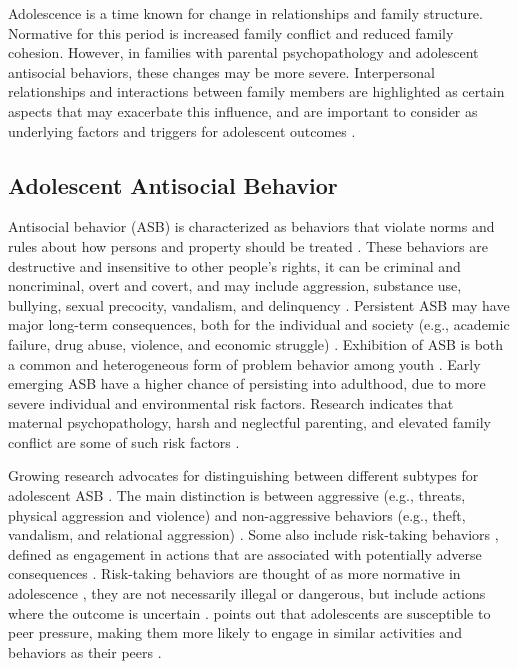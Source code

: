 
Adolescence is a time known for change in relationships and family structure. Normative for this period is increased family conflict and reduced family cohesion. However, in families with parental psychopathology and adolescent antisocial behaviors, these changes may be more severe. Interpersonal relationships and interactions between family members are highlighted as certain aspects that may exacerbate this influence, and are important to consider as underlying factors and triggers for adolescent outcomes \parencite{vanloon:2014, xu:2017}.

\subsection{Adolescent Antisocial Behavior}

Antisocial behavior (ASB) is characterized as behaviors that violate norms and rules about how persons and property should be treated \parencite{scott:2015}. These behaviors are destructive and insensitive to other people's rights, it can be criminal and noncriminal, overt and covert, and may include aggression, substance use, bullying, sexual precocity, vandalism, and delinquency \parencite{dishion:2006}. Persistent ASB may have major long-term consequences, both for the individual and society (e.g., academic failure, drug abuse, violence, and economic struggle) \parencite{lobraico:2020, moffitt:2018}. Exhibition of ASB is both a common and heterogeneous form of problem behavior among youth  \parencite{frick:2009}. Early emerging ASB have a higher chance of persisting into adulthood, due to more severe individual and environmental risk factors. Research indicates that maternal psychopathology, harsh and neglectful parenting, and elevated family conflict are some of such risk factors \parencite{dishion:2006, moffitt:2015}.

Growing research advocates for distinguishing between different subtypes for adolescent ASB \parencite{burt:2012, burt:2009, kornienko:2019}. The main distinction is between aggressive (e.g., threats, physical aggression and violence) and non-aggressive behaviors (e.g., theft, vandalism, and relational aggression) \parencite{burt:2016, kornienko:2019, little:2003}. Some also include risk-taking behaviors \parencite{mishra:2008}, defined as engagement in actions that are associated with potentially adverse consequences \parencite{boyer:2006}. Risk-taking behaviors are thought of as more normative in adolescence \parencite{moffitt:2018, sundell:2019}, they are not necessarily illegal or dangerous, but include actions where the outcome is uncertain \parencite{ciranka:2021}. \textcite{steinberg:2004} points out that adolescents are susceptible to peer pressure, making them more likely to engage in similar activities and behaviors as their peers \parencite{ciranka:2021}.

